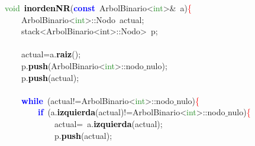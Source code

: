 \noindent
\mbox{}\textcolor{ForestGreen}{void}\ \textbf{\textcolor{Black}{inordenNR}}\textcolor{BrickRed}{(}\textbf{\textcolor{Blue}{const}}\ ArbolBinario\textcolor{BrickRed}{\textless{}}\textcolor{ForestGreen}{int}\textcolor{BrickRed}{\textgreater{}\&}\ a\textcolor{BrickRed}{)}\textcolor{Red}{\{} \\
\mbox{}\ \ \ \ ArbolBinario\textcolor{BrickRed}{\textless{}}\textcolor{ForestGreen}{int}\textcolor{BrickRed}{\textgreater{}::}\textcolor{TealBlue}{Nodo}\ actual\textcolor{BrickRed}{;} \\
\mbox{}\ \ \ \ \textcolor{TealBlue}{stack\textless{}ArbolBinario\textless{}int\textgreater{}::Nodo\textgreater{}}\ p\textcolor{BrickRed}{;} \\
\mbox{}\ \ \ \  \\
\mbox{}\ \ \ \ actual\textcolor{BrickRed}{=}a\textcolor{BrickRed}{.}\textbf{\textcolor{Black}{raiz}}\textcolor{BrickRed}{();} \\
\mbox{}\ \ \ \ p\textcolor{BrickRed}{.}\textbf{\textcolor{Black}{push}}\textcolor{BrickRed}{(}ArbolBinario\textcolor{BrickRed}{\textless{}}\textcolor{ForestGreen}{int}\textcolor{BrickRed}{\textgreater{}::}nodo$\_$nulo\textcolor{BrickRed}{);} \\
\mbox{}\ \ \ \ p\textcolor{BrickRed}{.}\textbf{\textcolor{Black}{push}}\textcolor{BrickRed}{(}actual\textcolor{BrickRed}{);} \\
\mbox{}\ \ \ \  \\
\mbox{}\ \ \ \ \textbf{\textcolor{Blue}{while}}\ \textcolor{BrickRed}{(}actual\textcolor{BrickRed}{!=}ArbolBinario\textcolor{BrickRed}{\textless{}}\textcolor{ForestGreen}{int}\textcolor{BrickRed}{\textgreater{}::}nodo$\_$nulo\textcolor{BrickRed}{)}\textcolor{Red}{\{} \\
\mbox{}\ \ \ \ \ \ \ \ \textbf{\textcolor{Blue}{if}}\ \textcolor{BrickRed}{(}a\textcolor{BrickRed}{.}\textbf{\textcolor{Black}{izquierda}}\textcolor{BrickRed}{(}actual\textcolor{BrickRed}{)!=}ArbolBinario\textcolor{BrickRed}{\textless{}}\textcolor{ForestGreen}{int}\textcolor{BrickRed}{\textgreater{}::}nodo$\_$nulo\textcolor{BrickRed}{)}\textcolor{Red}{\{} \\
\mbox{}\ \ \ \ \ \ \ \ \ \ \ \ actual\textcolor{BrickRed}{=}\ a\textcolor{BrickRed}{.}\textbf{\textcolor{Black}{izquierda}}\textcolor{BrickRed}{(}actual\textcolor{BrickRed}{);} \\
\mbox{}\ \ \ \ \ \ \ \ \ \ \ \ p\textcolor{BrickRed}{.}\textbf{\textcolor{Black}{push}}\textcolor{BrickRed}{(}actual\textcolor{BrickRed}{);} \\
